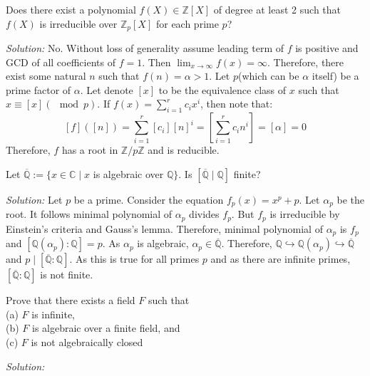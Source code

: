 \documentclass[a4paper, 11pt]{article}
\newenvironment{solution}
    {\textit{Solution:}}
    {}
\begin{document}
\begin{tcolorbox}[colback=c2,colframe=c1,title=Problem 1.8]
    Does there exist a polynomial $f(X) \in \mathbb Z[X]$ of degree at least 2 such that
$f(X)$ is irreducible over $\mathbb Z_p[X]$ for each prime $p$?
\end{tcolorbox}
\begin{solution}
    No. Without loss of generality assume leading term of $f$ is positive and GCD of all coefficients of $f=1$. 
    Then $\lim_{x\to\infty}f(x)=\infty$. Therefore, there exist some natural $n$ such that $f(n)=\alpha>1$. Let $p$(which can be $\alpha$ itself) be a prime factor of $\alpha$. Let denote $[x]$ to be the equivalence class of $x$ such that $x\equiv[x](\mod p)$. If $f(x)=\sum_{i=1}^rc_ix^i$, then note that:
    $$[f]\left([n]\right)=\sum_{i=1}^r\left[c_i\right][n]^i=\left[\sum_{i=1}^rc_in^i\right]=[\alpha]=0$$
    Therefore, $f$ has a root in $\mathbb Z/p\mathbb Z$ and is reducible.
\end{solution}





\begin{tcolorbox}[colback=c2,colframe=c1,title=Problem 1.9]
    Let $\overline{ \mathbb Q} := \{x \in \mathbb C \mid x$ is algebraic over $\mathbb Q\}$. Is $[\overline{\mathbb Q}\mid\mathbb Q]$ finite?
\end{tcolorbox}
\begin{solution}
    Let $p$ be a prime. Consider the equation $f_p(x)=x^p+p$. Let $\alpha_p$ be the root. It follows minimal polynomial of $\alpha_p$ divides $f_p$. But $f_p$ is irreducible by Einstein's criteria and Gauss's lemma. Therefore, minimal polynomial of $\alpha_p$ is $f_p$ and $[\mathbb Q(\alpha_p):\mathbb{Q}]=p$. As $\alpha_p$ is algebraic, $\alpha_p\in\overline{\mathbb Q}$. Therefore, $\mathbb Q\hookrightarrow\mathbb Q(\alpha_p)\hookrightarrow \overline{\mathbb Q}$ and $p\mid[\overline{\mathbb Q}:\mathbb Q]$. As this is true for all primes $p$ and as there are infinite primes, $[\overline{\mathbb Q}:\mathbb Q]$ is not finite.
\end{solution}

\begin{tcolorbox}[colback=c2,colframe=c1,title=Problem 1.10]
    Prove that there exists a field $F$ such that\\
(a) $F$ is infinite,\\
(b) $F$ is algebraic over a finite field, and\\
(c) $F$ is not algebraically closed
\end{tcolorbox}
\begin{solution}
    
\end{solution}
\end{document}
